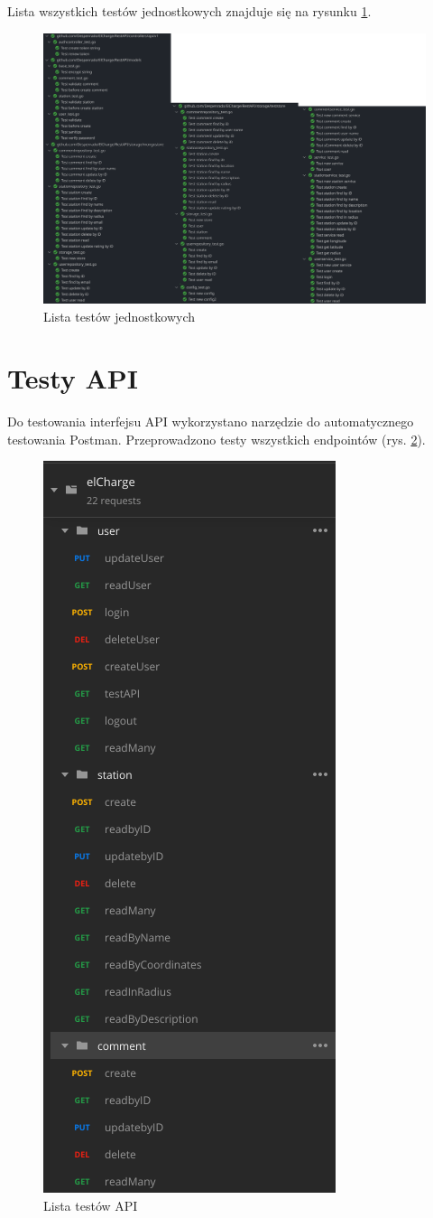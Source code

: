 Lista wszystkich testów jednostkowych znajduje się na rysunku \ref{fig:test_list}.
\begin{figure}[ht]
    \centering
        \includegraphics[width=1\linewidth]{rys04/test_list.png}
        \caption{Lista testów jednostkowych}
    \label{fig:test_list}
\end{figure}

% 
\section{Testy API}
Do testowania interfejsu API wykorzystano narzędzie do automatycznego testowania Postman.
Przeprowadzono testy wszystkich endpointów (rys. \ref{fig:postma_list}).
\begin{figure}[ht]
    \centering
        \includegraphics[width=0.3\linewidth]{rys04/postman_list.png}
        \caption{Lista testów API}
    \label{fig:postma_list}
\end{figure}
\newpage

